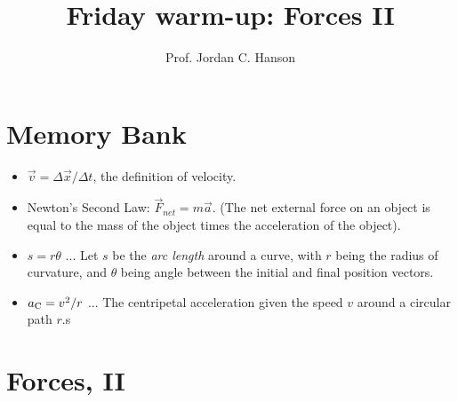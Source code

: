 \documentclass{article}
\begin{document}
\twocolumn

\title{Friday warm-up: Forces II}
\author{Prof. Jordan C. Hanson}

\maketitle

\section{Memory Bank}

\begin{itemize}
\item $\vec{v} = \Delta \vec{x} / \Delta t$, the definition of velocity.
\item Newton's Second Law: $\vec{F}_{net} = m\vec{a}$. (The net external force on an object is equal to the mass of the object times the acceleration of the object).
\item $s = r\theta$ ... Let $s$ be the \textit{arc length} around a curve, with $r$ being the radius of curvature, and $\theta$ being angle between the initial and final position vectors.
\item $a_{\rm C} = v^2/r$ ... The centripetal acceleration given the speed $v$ around a circular path $r$.s
\end{itemize}

\section{Forces, II}
\end{document}
